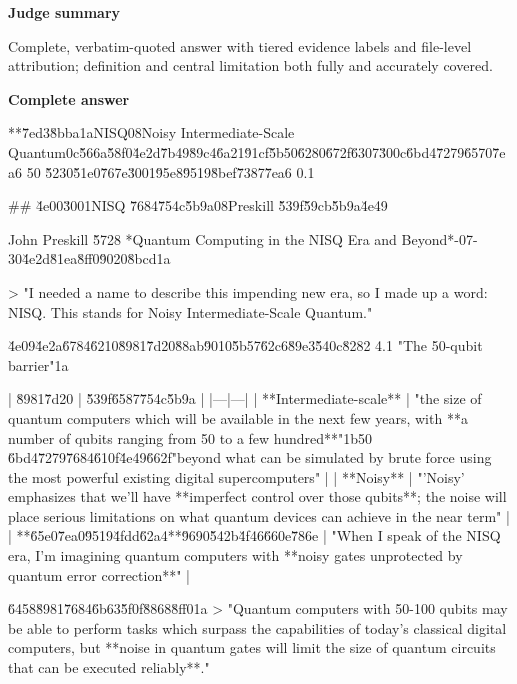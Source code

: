 \documentclass[10pt]{article}
\begin{document}
\textbf{Judge summary}
\begin{EvidenceText}
Complete, verbatim-quoted answer with tiered evidence labels and file-level attribution; definition and central limitation both fully and accurately covered.
\end{EvidenceText}

\textbf{Complete answer}
\begin{AnswerText}
**\u7ed3\u8bba\uff1aNISQ\uff08Noisy Intermediate-Scale Quantum\uff0c\u566a\u58f0\u4e2d\u7b49\u89c4\u6a21\u91cf\u5b50\u6280\u672f\u6307\u300c\u6bd4\u7279\u6570\u7ea6 50 \u5230\u51e0\u767e\u3001\u95e8\u9519\u8bef\u7387\u7ea6 0.1%

## \u4e00\u3001NISQ \u7684\u754c\u5b9a\uff08Preskill \u539f\u59cb\u5b9a\u4e49

John Preskill \u5728 *Quantum Computing in the NISQ Era and Beyond*-07-30\u4e2d\u81ea\u8ff0\u9020\u8bcd\uff1a

> "I needed a name to describe this impending new era, so I made up a word: NISQ. This stands for Noisy Intermediate-Scale Quantum."

\u4e09\u4e2a\u6784\u6210\u8981\u7d20\u88ab\u9010\u5b57\u62c6\u89e3\u540c\u8282 4.1 "The 50-qubit barrier"\uff1a

| \u8981\u7d20 | \u539f\u6587\u754c\u5b9a |
|---|---|
| **Intermediate-scale** | "the size of quantum computers which will be available in the next few years, with **a number of qubits ranging from 50 to a few hundred**"\uff1b50 \u6bd4\u7279\u7684\u610f\u4e49\u662f"beyond what can be simulated by brute force using the most powerful existing digital supercomputers" |
| **Noisy** | "'Noisy' emphasizes that we'll have **imperfect control over those qubits**; the noise will place serious limitations on what quantum devices can achieve in the near term" |
| **\u65e0\u7ea0\u9519\u4fdd\u62a4**\u9690\u542b\u4f46\u660e\u786e | "When I speak of the NISQ era, I'm imagining quantum computers with **noisy gates unprotected by quantum error correction**" |

\u6458\u8981\u7684\u6b63\u5f0f\u8868\u8ff0\uff1a
> "Quantum computers with 50-100 qubits may be able to perform tasks which surpass the capabilities of today's classical digital computers, but **noise in quantum gates will limit the size of quantum circuits that can be executed reliably**."


\end{AnswerText}
\end{document}
